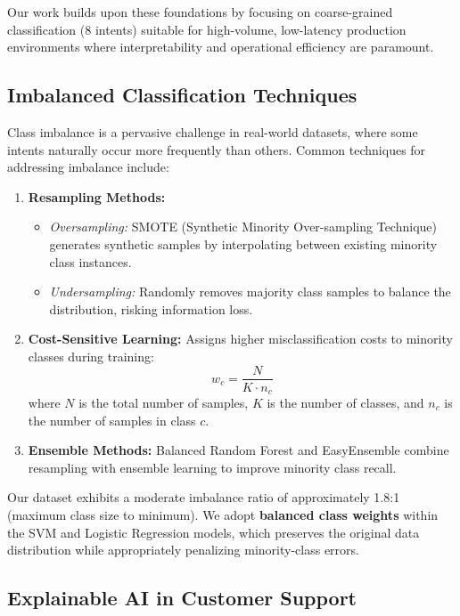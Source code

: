 \documentclass[12pt,a4paper]{article}
\begin{document}
Our work builds upon these foundations by focusing on coarse-grained classification (8 intents) suitable for high-volume, low-latency production environments where interpretability and operational efficiency are paramount.

\subsection{Imbalanced Classification Techniques}
\label{subsec:imbalanced}

Class imbalance is a pervasive challenge in real-world datasets, where some intents naturally occur more frequently than others. Common techniques for addressing imbalance include:

\begin{enumerate}[leftmargin=*]
    \item \textbf{Resampling Methods:}
    \begin{itemize}
        \item \textit{Oversampling:} SMOTE (Synthetic Minority Over-sampling Technique) generates synthetic samples by interpolating between existing minority class instances.
        \item \textit{Undersampling:} Randomly removes majority class samples to balance the distribution, risking information loss.
    \end{itemize}

    \item \textbf{Cost-Sensitive Learning:} Assigns higher misclassification costs to minority classes during training:
    \begin{equation}
        w_c = \frac{N}{K \cdot n_c}
    \end{equation}
    where $N$ is the total number of samples, $K$ is the number of classes, and $n_c$ is the number of samples in class $c$.

    \item \textbf{Ensemble Methods:} Balanced Random Forest and EasyEnsemble combine resampling with ensemble learning to improve minority class recall.
\end{enumerate}

Our dataset exhibits a moderate imbalance ratio of approximately 1.8:1 (maximum class size to minimum). We adopt \textbf{balanced class weights} within the SVM and Logistic Regression models, which preserves the original data distribution while appropriately penalizing minority-class errors.

\subsection{Explainable AI in Customer Support}
\label{subsec:xai}
\end{document}
